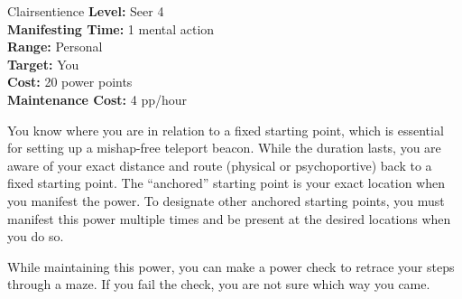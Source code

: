 {Clairsentience}
{
	\textbf{Level:}
	Seer 4\\
	\textbf{Manifesting Time:}
	1 mental action\\
	\textbf{Range:}
	Personal\\
	\textbf{Target:}
	You\\
	\textbf{Cost:}
	20 power points\\
	\textbf{Maintenance Cost:}
	4 pp/hour\\
}
{
	You know where you are in relation to a fixed starting point, which is essential for setting up a mishap-free teleport beacon. While the duration lasts, you are aware of your exact distance and route (physical or psychoportive) back to a fixed starting point. The ``anchored'' starting point is your exact location when you manifest the power. To designate other anchored starting points, you must manifest this power multiple times and be present at the desired locations when you do so.

	While maintaining this power, you can make a power check to retrace your steps through a maze. If you fail the check, you are not sure which way you came.
}